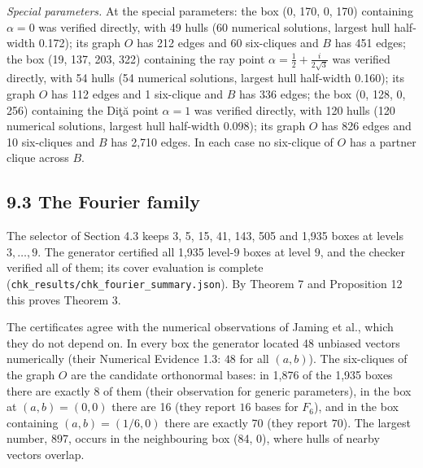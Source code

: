 \documentclass[
  11pt,
]{article}
\begin{document}
\emph{Special parameters.} At the special parameters: the box (0, 170,
0, 170) containing \(\alpha=0\) was verified directly, with 49 hulls (60
numerical solutions, largest hull half-width 0.172); its graph \(O\) has
212 edges and 60 six-cliques and \(B\) has 451 edges; the box (19, 137,
203, 322) containing the ray point
\(\alpha=\tfrac12+\tfrac{i}{2\sqrt3}\) was verified directly, with 54
hulls (54 numerical solutions, largest hull half-width 0.160); its graph
\(O\) has 112 edges and 1 six-clique and \(B\) has 336 edges; the box
(0, 128, 0, 256) containing the Diţă point \(\alpha=1\) was verified
directly, with 120 hulls (120 numerical solutions, largest hull
half-width 0.098); its graph \(O\) has 826 edges and 10 six-cliques and
\(B\) has 2,710 edges. In each case no six-clique of \(O\) has a partner
clique across \(B\).

\subsection{9.3 The Fourier family}\label{the-fourier-family-1}

The selector of Section 4.3 keeps 3, 5, 15, 41, 143, 505 and 1,935 boxes
at levels \(3,\dots,9\). The generator certified all 1,935 level-\(9\)
boxes at level \(9\), and the checker verified all of them; its cover
evaluation is complete
(\texttt{chk\_results/chk\_fourier\_summary.json}). By Theorem 7 and
Proposition 12 this proves Theorem 3.

The certificates agree with the numerical observations of Jaming et al.,
which they do not depend on. In every box the generator located 48
unbiased vectors numerically (their Numerical Evidence 1.3: \(48\) for
all \((a,b)\)). The six-cliques of the graph \(O\) are the candidate
orthonormal bases: in 1,876 of the 1,935 boxes there are exactly \(8\)
of them (their observation for generic parameters), in the box at
\((a,b)=(0,0)\) there are 16 (they report \(16\) bases for \(F_6\)), and
in the box containing \((a,b)=(1/6,0)\) there are exactly 70 (they
report \(70\)). The largest number, 897, occurs in the neighbouring box
(84, 0), where hulls of nearby vectors overlap.
\end{document}
